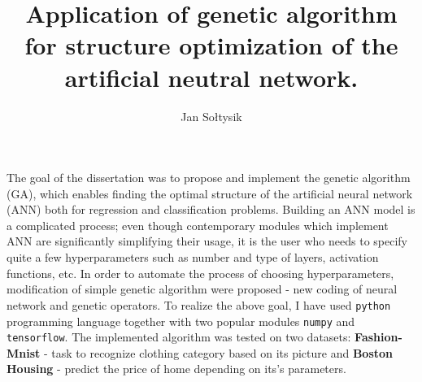 \documentclass{article}
\title{ Application of genetic algorithm for structure optimization of the artificial neutral network.}
\author{Jan Sołtysik}
\begin{document}
\maketitle

The goal of the dissertation was to propose and implement the genetic algorithm (GA), which enables finding the optimal structure of the artificial neural network (ANN) both for regression and classification problems. Building an ANN model is a complicated process; even though contemporary modules which implement ANN are significantly simplifying their usage, it is the user who needs to specify quite a few hyperparameters such as number and type of layers, activation functions, etc. In order to automate the process of choosing hyperparameters, modification of simple genetic algorithm were proposed - new coding of neural network and genetic operators. To realize the above goal, I have used \texttt{python} programming language together with two popular modules \texttt{numpy} and \texttt{tensorflow}. The implemented algorithm was tested on two datasets: \textbf{Fashion-Mnist} - task to recognize clothing category based on its picture and \textbf{Boston Housing} - predict the price of home depending on its’s parameters.
\end{document}
